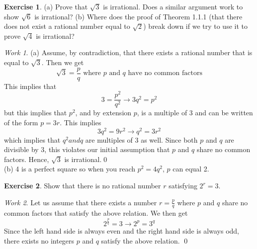 \documentclass[12pt,letterpaper]{report}
\theoremstyle{definition}
\newtheorem{exercise}{Exercise}[section]
\theoremstyle{remark}
\newtheorem*{work}{Work}
\begin{document}
\begin{exercise}
(a) Prove that $\sqrt{3}$ is irrational. Does a similar argument work to show $\sqrt{6}$ is irrational?
(b) Where does the proof of Theorem 1.1.1 (that there does not exist a rational number equal to $\sqrt{2}$) break down if we try to use it to prove $\sqrt{4}$ is irrational?
\end{exercise}
\begin{work}
    (a) Assume, by contradiction, that there exists a rational number that is equal to $\sqrt{3}$. Then we get
    \begin{equation*}
        \sqrt{3} = \frac{p}{q} \text{ where $p$ and $q$ have no common factors}
    \end{equation*}
    This implies that 
    \begin{equation*}
        3 =  \frac{p^2}{q^2} \rightarrow 3q^2 = p^2
    \end{equation*}
    but this implies that $p^2$, and by extension $p$, is a multiple of 3 and can be written of the form $p=3r$. This implies
    \begin{equation*}
        3q^2 = 9r^2 \rightarrow q^2 = 3r^2
    \end{equation*}
    which implies that $q^2 and q$ are multiples of 3 as well. Since both $p$ and $q$ are divisible by 3, this violates our initial assumption that $p$ and $q$ share no common factors. Hence, $\sqrt{3}$ is irrational.\qed \\
    \medskip
    (b) 4 is a perfect square so when you reach $p^2 = 4q^2$, $p$ can equal 2.
\end{work}

\begin{exercise}
    Show that there is no rational number $r$ satisfying $2^r = 3$.
\end{exercise}
\begin{work}
    Let us assume that there exists a number $r = \frac{p}{q}$ where $p$ and $q$ share no common factors that satisfy the above relation. We then get 
    \begin{equation*}
        2^{\frac{p}{q}} = 3 \rightarrow 2^p = 3^q
    \end{equation*}
    Since the left hand side is always even and the right hand side is always odd, there exists no integers $p$ and $q$ satisfy the above relation.
    \qed
\end{work}
\end{document}
